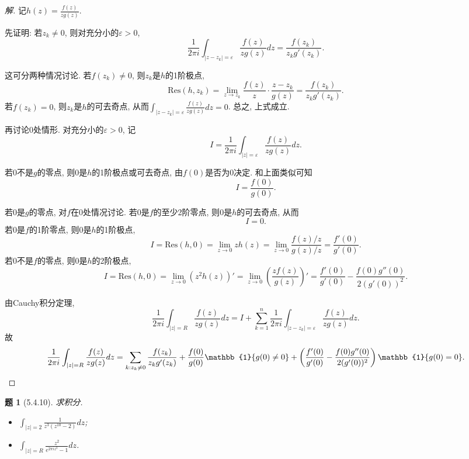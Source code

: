 \documentclass{article}[a4paper, 12pt]
\theoremstyle{mystyle}
\newtheorem{problem}{题}
\newenvironment{solution}{\begin{proof}[解]}{\end{proof}}
\begin{document}
\begin{solution}
  记\(h(z)=\frac{f(z)}{zg(z)}\).

  先证明: 若\(z_k\ne0\), 则对充分小的\(\varepsilon>0\),\[\frac{1}{2\pi i}\int_{|z-z_k|=\varepsilon}\frac{f(z)}{zg(z)}dz=\frac{f(z_k)}{z_kg'(z_k)}.\] 
  
  这可分两种情况讨论. 若\(f(z_k)\ne 0\), 则\(z_k\)是\(h\)的1阶极点, \[\text{Res}(h,z_k)=\lim_{z\to z_k}\frac{f(z)}{z}\cdot\frac{z-z_k}{g(z)}=\frac{f(z_k)}{z_kg'(z_k)}.\] 若\(f(z_k)=0\), 则\(z_k\)是\(h\)的可去奇点, 从而\(\int_{|z-z_k|=\varepsilon}\frac{f(z)}{zg(z)}dz=0\). 总之, 上式成立.

  再讨论\(0\)处情形. 对充分小的\(\varepsilon>0\), 记\[I=\frac{1}{2\pi i}\int_{|z|=\varepsilon}\frac{f(z)}{zg(z)}dz.\]
  
  若\(0\)不是\(g\)的零点, 则\(0\)是\(h\)的1阶极点或可去奇点, 由\(f(0)\)是否为0决定. 和上面类似可知\[I=\frac{f(0)}{g(0)}.\]

  若\(0\)是\(g\)的零点, 对\(f\)在0处情况讨论. \newline 若\(0\)是\(f\)的至少2阶零点, 则\(0\)是\(h\)的可去奇点, 从而\[I=0.\] 若\(0\)是\(f\)的1阶零点, 则\(0\)是\(h\)的1阶极点, \[I=\text{Res}(h,0)=\lim_{z\to0}zh(z)=\lim_{z\to0}\frac{f(z)/z}{g(z)/z}=\frac{f'(0)}{g'(0)}.\] 若\(0\)不是\(f\)的零点, 则\(0\)是\(h\)的2阶极点, \[I=\text{Res}(h,0)=\lim_{z\to0}(z^2h(z))'=\lim_{z\to0}\left(\frac{zf(z)}{g(z)}\right)'=\frac{f'(0)}{g'(0)}-\frac{f(0)g''(0)}{2(g'(0))^2}.\]

  由Cauchy积分定理, \[\frac{1}{2\pi i}\int_{|z|=R}\frac{f(z)}{zg(z)}dz=I+\sum_{k=1}^n\frac{1}{2\pi i}\int_{|z-z_k|=\varepsilon}\frac{f(z)}{zg(z)}dz.\] 故\[\frac{1}{2\pi i}\int_{|z|=R}\frac{f(z)}{zg(z)}dz=\sum_{k:z_k\ne0}\frac{f(z_k)}{z_kg'(z_k)}+\frac{f(0)}{g(0)}\mathbb{1}\{g(0)\ne0\}+\left(\frac{f'(0)}{g'(0)}-\frac{f(0)g''(0)}{2(g'(0))^2}\right)\mathbb{1}\{g(0)=0\}.\qedhere\]
\end{solution}

\begin{problem}[5.4.10]
  求积分.
  \begin{itemize}
    \item [(1)] \(\int_{|z|=2}\frac{1}{z^3(z^{10}-2)}dz\);
    \item [(4)] \(\int_{|z|=R}\frac{z^2}{e^{2\pi i z^3}-1}dz\).
  \end{itemize}
\end{problem}
\end{document}

